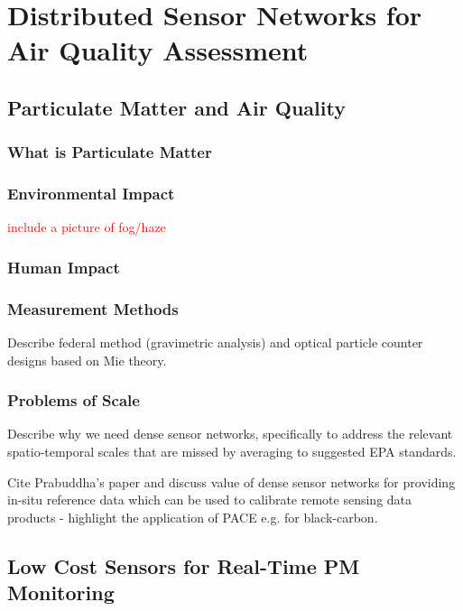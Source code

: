 \chapter{Distributed Sensor Networks for Air Quality Assessment}\label{ch:air-network}

\section{Particulate Matter and Air Quality}

\subsection{What is Particulate Matter}

\subsection{Environmental Impact}

\textcolor{red}{include a picture of fog/haze}

\subsection{Human Impact}


\subsection{Measurement Methods}

Describe federal method (gravimetric analysis) and optical particle counter
designs based on Mie theory.

\subsection{Problems of Scale}

Describe why we need dense sensor networks, specifically to address the relevant
spatio-temporal scales that are missed by averaging to suggested EPA standards.

Cite Prabuddha's paper and discuss value of dense sensor networks for providing
in-situ reference data which can be used to calibrate remote sensing data
products - highlight the application of PACE e.g. for black-carbon.

\section{Low Cost Sensors for Real-Time PM Monitoring}

